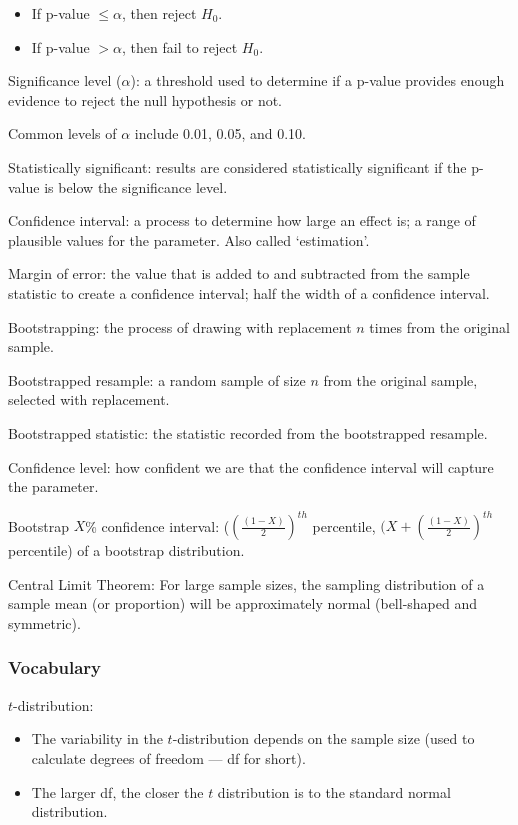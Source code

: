 \documentclass[
]{report}
\newcommand{\rgs}{\vspace{12pt}} %
\newcommand{\rgi}{\hspace{24pt}}  %
\begin{document}
\begin{itemize}
\item
  If p-value \(\leq \alpha\), then reject \(H_0\).
\item
  If p-value \(> \alpha\), then fail to reject \(H_0\).
\end{itemize}

Significance level (\(\alpha\)): a threshold used to determine if a p-value provides enough evidence to reject the null hypothesis or not.

\rgi Common levels of \(\alpha\) include 0.01, 0.05, and 0.10.

Statistically significant: results are considered statistically significant if the p-value is below the significance level.

Confidence interval: a process to determine how large an effect is; a range of plausible values for the parameter. Also called `estimation'.

Margin of error: the value that is added to and subtracted from the sample statistic to create a confidence interval; half the width of a confidence interval.

Bootstrapping: the process of drawing with replacement \(n\) times from the original sample.

Bootstrapped resample: a random sample of size \(n\) from the original sample, selected with replacement.

Bootstrapped statistic: the statistic recorded from the bootstrapped resample.

Confidence level: how confident we are that the confidence interval will capture the parameter.

Bootstrap \(X\)\% confidence interval: (\((\frac{(1-X)}{2})^{th}\) percentile, \((X+(\frac{(1-X)}{2})^{th}\) percentile) of a bootstrap distribution.

Central Limit Theorem: For large sample sizes, the sampling distribution of a sample mean (or proportion) will be approximately normal (bell-shaped and symmetric).

\hypertarget{vocabulary-16}{%
\subsubsection*{Vocabulary}\label{vocabulary-16}}

\(t\)-distribution:
\rgs 

\begin{itemize}
\item
  The variability in the \(t\)-distribution depends on the sample size (used to calculate degrees of freedom --- df for short).
\item
  The larger df, the closer the \(t\) distribution is to the standard normal distribution.
\end{itemize}
\end{document}
